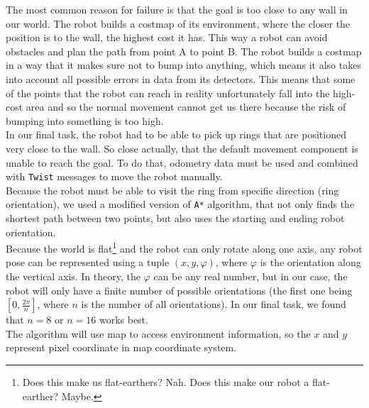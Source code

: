 \documentclass[12pt,a4paper]{article}
\begin{document}
	The most common reason for failure is that the goal is too close to any wall in our world. The robot builds a costmap of its environment, where the closer the position is to the wall, the highest cost it has. This way a robot can avoid obstacles and plan the path from point A to point B. The robot builds a costmap in a way that it makes sure not to bump into anything, which means it also takes into account all possible errors in data from its detectors. This means that some of the points that the robot can reach in reality unfortunately fall into the high-cost area and so the normal movement cannot get us there because the risk of bumping into something is too high. \\

	In our final task, the robot had to be able to pick up rings that are positioned very close to the wall. So close actually, that the default movement component is unable to reach the goal. To do that, odometry data must be used and combined with \texttt{Twist} messages to move the robot manually. \\
	
	Because the robot must be able to visit the ring from specific direction (ring orientation), we used a modified version of \texttt{A*} algorithm, that not only finds the shortest path between two points, but also uses the starting and ending robot orientation. \\
	
	Because the world is flat\footnote{Does this make us flat-earthers? Nah. Does this make our robot a flat-earther? Maybe.} and the robot can only rotate along one axis, any robot pose can be represented using a tuple $(x, y, \varphi)$, where $\varphi$ is the orientation along the vertical axis. In theory, the $\varphi$ can be any real number, but in our case, the robot will only have a finite number of possible orientations (the first one being $[0, \frac{2\pi}{n}]$, where $n$ is the number of all orientations). In our final task, we found that $n = 8$ or $n = 16$ works best. \\

	The algorithm will use map to access environment information, so the $x$ and $y$ represent pixel coordinate in map coordinate system. \\
	
\end{document}
